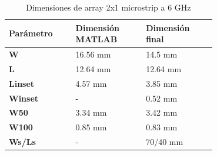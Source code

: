 \begin{table}[H]
  
   \label{tab:array2x12}
   \small %
   \centering %
   \begin{tabular}{m{0.2\linewidth}m{0.25\linewidth}m{0.25\linewidth}} %
   \toprule[\heavyrulewidth]\toprule[\heavyrulewidth]
   \textbf{Parámetro} & \textbf{Dimensión MATLAB} & \textbf{Dimensión final} \\ 
   \midrule
   \textbf{W} & 16.56 mm & 14.5 mm \\
   \textbf{L} & 12.64 mm & 12.64 mm\\
   \textbf{Linset} & 4.57 mm & 3.85 mm\\
   \textbf{Winset} & - & 0.52 mm\\
   \textbf{W50} & 3.34 mm & 3.42 mm\\
   \textbf{W100} & 0.85 mm & 0.83 mm\\
   \textbf{Ws/Ls} & - & 70/40 mm\\
   \bottomrule[\heavyrulewidth] 
   \end{tabular}
   \caption{Dimensiones de array 2x1 microstrip a 6 GHz} 
\end{table}







